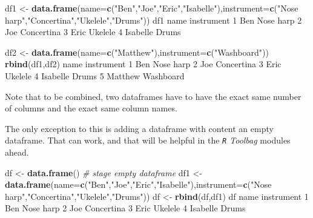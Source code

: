 \documentclass[
]{book}
\newenvironment{Shaded}{\begin{snugshade}}{\end{snugshade}}
\newcommand{\CommentTok}[1]{\textcolor[rgb]{0.56,0.35,0.01}{\textit{#1}}}
\newcommand{\DataTypeTok}[1]{\textcolor[rgb]{0.13,0.29,0.53}{#1}}
\newcommand{\DecValTok}[1]{\textcolor[rgb]{0.00,0.00,0.81}{#1}}
\newcommand{\KeywordTok}[1]{\textcolor[rgb]{0.13,0.29,0.53}{\textbf{#1}}}
\newcommand{\NormalTok}[1]{#1}
\newcommand{\StringTok}[1]{\textcolor[rgb]{0.31,0.60,0.02}{#1}}
\begin{document}
\begin{Shaded}
\begin{Highlighting}[]
\NormalTok{df1 <-}\StringTok{ }\KeywordTok{data.frame}\NormalTok{(}\DataTypeTok{name=}\KeywordTok{c}\NormalTok{(}\StringTok{"Ben"}\NormalTok{,}\StringTok{"Joe"}\NormalTok{,}\StringTok{"Eric"}\NormalTok{,}\StringTok{"Isabelle"}\NormalTok{),}\DataTypeTok{instrument=}\KeywordTok{c}\NormalTok{(}\StringTok{"Nose harp"}\NormalTok{,}\StringTok{"Concertina"}\NormalTok{,}\StringTok{"Ukelele"}\NormalTok{,}\StringTok{"Drums"}\NormalTok{))}
\NormalTok{df1}
\NormalTok{      name instrument}
\DecValTok{1}\NormalTok{      Ben  Nose harp}
\DecValTok{2}\NormalTok{      Joe Concertina}
\DecValTok{3}\NormalTok{     Eric    Ukelele}
\DecValTok{4}\NormalTok{ Isabelle      Drums}

\NormalTok{df2 <-}\StringTok{ }\KeywordTok{data.frame}\NormalTok{(}\DataTypeTok{name=}\KeywordTok{c}\NormalTok{(}\StringTok{"Matthew"}\NormalTok{),}\DataTypeTok{instrument=}\KeywordTok{c}\NormalTok{(}\StringTok{"Washboard"}\NormalTok{))}
\KeywordTok{rbind}\NormalTok{(df1,df2)}
\NormalTok{      name instrument}
\DecValTok{1}\NormalTok{      Ben  Nose harp}
\DecValTok{2}\NormalTok{      Joe Concertina}
\DecValTok{3}\NormalTok{     Eric    Ukelele}
\DecValTok{4}\NormalTok{ Isabelle      Drums}
\DecValTok{5}\NormalTok{  Matthew  Washboard}
\end{Highlighting}
\end{Shaded}

Note that to be combined, two dataframes have to have the exact same number of columns and the exact same column names.

The only exception to this is adding a dataframe with content an empty dataframe. That can work, and that will be helpful in the \emph{\texttt{R} Toolbag} modules ahead.

\begin{Shaded}
\begin{Highlighting}[]
\NormalTok{df <-}\StringTok{ }\KeywordTok{data.frame}\NormalTok{() }\CommentTok{# stage empty dataframe}
\NormalTok{df1 <-}\StringTok{ }\KeywordTok{data.frame}\NormalTok{(}\DataTypeTok{name=}\KeywordTok{c}\NormalTok{(}\StringTok{"Ben"}\NormalTok{,}\StringTok{"Joe"}\NormalTok{,}\StringTok{"Eric"}\NormalTok{,}\StringTok{"Isabelle"}\NormalTok{),}\DataTypeTok{instrument=}\KeywordTok{c}\NormalTok{(}\StringTok{"Nose harp"}\NormalTok{,}\StringTok{"Concertina"}\NormalTok{,}\StringTok{"Ukelele"}\NormalTok{,}\StringTok{"Drums"}\NormalTok{))}
\NormalTok{df <-}\StringTok{ }\KeywordTok{rbind}\NormalTok{(df,df1)}
\NormalTok{df}
\NormalTok{      name instrument}
\DecValTok{1}\NormalTok{      Ben  Nose harp}
\DecValTok{2}\NormalTok{      Joe Concertina}
\DecValTok{3}\NormalTok{     Eric    Ukelele}
\DecValTok{4}\NormalTok{ Isabelle      Drums}
\end{Highlighting}
\end{Shaded}
\end{document}
